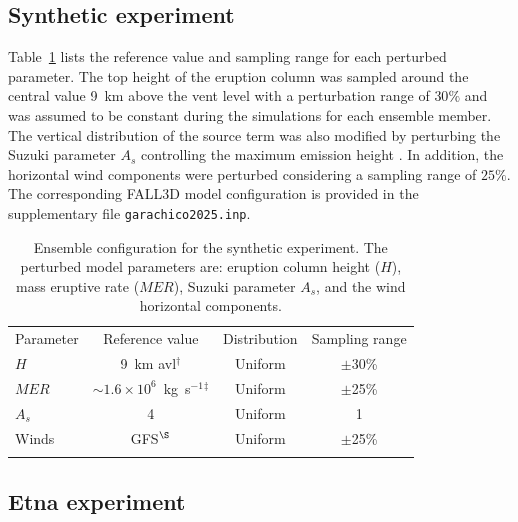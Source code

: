 \documentclass[acp,manuscript,noline]{copernicus}
\begin{document}
\subsection{Synthetic experiment}

Table~\ref{tab:ensemble-synthetic} lists the reference value and sampling range
for each perturbed parameter. The top height of the eruption column was sampled
around the central value 9~\unit{km} above the vent level with a perturbation
range of $30\%$ and was assumed to be constant during the simulations for each
ensemble member. The vertical distribution of the source term was also modified
by perturbing the Suzuki parameter $A_s$ controlling the maximum emission
height \citep[see][for more information]{folch2020}. In addition, the
horizontal wind components were perturbed considering a sampling range of
$25\%$. The corresponding FALL3D model configuration is provided in the
supplementary file \texttt{garachico2025.inp}.

\begin{table}[h]
  \caption{
    Ensemble configuration for the synthetic experiment. The perturbed model
    parameters are: eruption column height ($H$), mass eruptive rate ($MER$),
    Suzuki parameter $A_s$, and the wind horizontal components.
  }
    \label{tab:ensemble-synthetic}
    \begin{tabular}{lccc}
    \tophline
    Parameter        & Reference value          & Distribution & Sampling range  \\ \middlehline
    $H$              & 9~km avl$^\dag$          & Uniform      & $\pm$30\%       \\
    $MER$            & $\sim 1.6\times 10^6$~kg~s$^{-1}$$^\ddag$ & Uniform      & $\pm$25\%       \\
    $A_s$            & 4                        & Uniform      & 1               \\
    Winds            & GFS$^\S$                 & Uniform      & $\pm$25\%       \\
    \bottomhline
    \end{tabular}
\end{table}

\subsection{Etna experiment}
\end{document}
